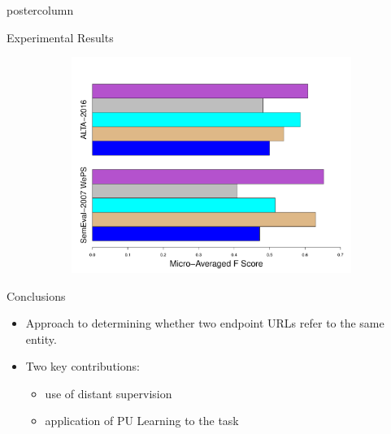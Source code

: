 \documentclass{beamer}
\begin{document}
\begin{frame}
\begin{columns}
\begin{column}{.5\textwidth}
\begin{beamercolorbox}[center]{postercolumn}
\begin{minipage}{.98\textwidth}
{\begin{block}{Experimental Results}
\begin{figure}
        \begin{figure}
							\begin{minipage}{1\textwidth}
								\centering\includegraphics[height=0.4\textwidth,width=1.25\textwidth,keepaspectratio]{img/ResultsWWW8.pdf}
							\end{minipage}
						\end{figure}
              \end{figure}
  
            \end{block}
         
            \begin{block}{Conclusions}
              \begin{itemize}
              \item Approach to determining whether two endpoint URLs refer to the same entity.
              \item Two key contributions:
                \begin{itemize}
                \item  use of distant supervision
                \item  application of PU Learning to the task
                \end{itemize}
              \end{itemize}
	\vspace{0.5em}
            \end{block}
		}\end{minipage}\end{beamercolorbox}
	\end{column}
\end{columns}
\end{frame}
\end{document}

